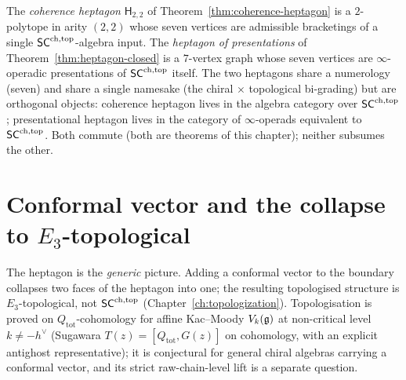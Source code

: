 \begin{remark}
\label{rem:heptagon-vs-heptagon-of-presentations}%
The \emph{coherence heptagon} $\mathsf{H}_{2,2}$ of
Theorem~\ref{thm:coherence-heptagon} is a $2$-polytope in arity
$(2, 2)$ whose seven vertices are admissible bracketings of a
single $\mathsf{SC}^{\mathrm{ch},\mathrm{top}}$-algebra input. The
\emph{heptagon of presentations} of
Theorem~\ref{thm:heptagon-closed} is a $7$-vertex graph whose
seven vertices are $\infty$-operadic presentations of
$\mathsf{SC}^{\mathrm{ch},\mathrm{top}}$ itself. The two heptagons share a numerology (seven)
and share a single namesake (the chiral $\times$ topological
bi-grading) but are orthogonal objects: coherence heptagon
lives in the algebra category over $\mathsf{SC}^{\mathrm{ch},\mathrm{top}}$;
presentational heptagon lives in the category of
$\infty$-operads equivalent to $\mathsf{SC}^{\mathrm{ch},\mathrm{top}}$. Both commute (both
are theorems of this chapter); neither subsumes the other.
\end{remark}
\section{Conformal vector and the collapse to $E_3$-topological}
\label{sec:heptagon-conformal-vector}

The heptagon is the \emph{generic} picture. Adding a conformal vector
to the boundary collapses two faces of the heptagon into one; the
resulting topologised structure is $E_3$-topological, not $\mathsf{SC}^{\mathrm{ch},\mathrm{top}}$
(Chapter~\ref{ch:topologization}). Topologisation is proved on
$Q_{\mathrm{tot}}$-cohomology for affine Kac--Moody $V_k(\mathfrak{g})$ at
non-critical level $k\neq -h^\vee$
(Sugawara $T(z)=[Q_{\mathrm{tot}},G(z)]$ on cohomology, with an
explicit antighost representative); it is conjectural for general
chiral algebras carrying a conformal vector, and its strict
raw-chain-level lift is a separate question.

